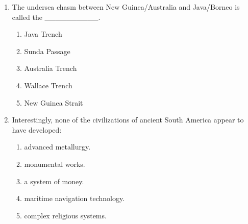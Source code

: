 \documentclass[12pt]{article}
\begin{document}
\begin{enumerate}[label=\arabic*.]
\begin{enumerate}[label=(\alph*)]
\end{enumerate}
\item The undersea chasm between New Guinea/Australia and Java/Borneo is called the \_\_\_\_\_\_\_\_\_\_.
\begin{enumerate}[label=(\alph*)]
    \item Java Trench
    \item Sunda Passage
    \item Australia Trench
    \item Wallace Trench
    \item New Guinea Strait
\end{enumerate}
\item Interestingly, none of the civilizations of ancient South America appear to have developed:
\begin{enumerate}[label=(\alph*)]
    \item advanced metallurgy.
    \item monumental works.
    \item a system of money.
    \item maritime navigation technology.
    \item complex religious systems.
\end{enumerate}
\end{enumerate}
\end{document}
